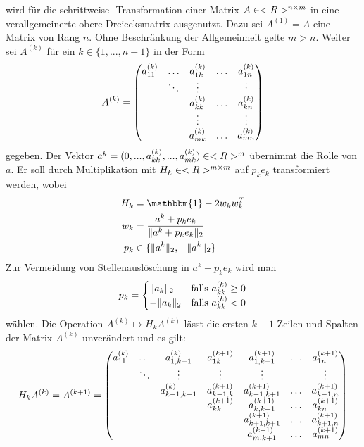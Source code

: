  wird für die schrittweise -Transformation einer Matrix $A\in<R>^{n\times m}$ in eine verallgemeinerte obere Dreiecksmatrix ausgenutzt. Dazu sei $A^{(1)}=A$ eine Matrix von Rang $n$. Ohne Beschränkung der Allgemeinheit gelte $m>n$. Weiter sei $A^{(k)}$ für ein $k\in\{1,...,n+1\}$ in der Form
\begin{align}
	A^{(k)} = \begin{pmatrix}
	a_{11}^{(k)} & \dots & a_{1k}^{(k)} & \dots & a_{1n}^{(k)} \\
	& \ddots & \vdots & & \vdots \\
	&& a_{kk}^{(k)} &  \dots & a_{kn}^{(k)} \\
	&& \vdots & & \vdots \\
	&& a_{mk}^{(k)} & \dots & a_{mn}^{(k)} 
	\end{pmatrix}\notag
\end{align}
gegeben. Der Vektor $a^k=(0,...,a_{kk}^{(k)},...,a_{mk}^{(k)})\in<R>^m$ übernimmt die Rolle von $a$. Er soll durch Multiplikation mit $H_k\in<R>^{m\times m}$ auf $p_ke_k$ transformiert werden, wobei
\begin{align}
	H_k &= \mathbbm{1} - 2w_kw_k^T \notag \\
	w_k &= \frac{a^k+p_ke_k}{\Vert a^k+p_ke_k\Vert_2} \notag \\
	p_k &\in \{\Vert a^k\Vert_2,-\Vert a^k\Vert_2\} \notag
\end{align}
Zur Vermeidung von Stellenauslöschung in $a^k+p_ke_k$ wird man
\begin{align}
	p_k = \begin{cases}
	\Vert a_k\Vert_2 & \text{falls } a_{kk}^{(k)}\ge 0 \\
	-\Vert a_k\Vert_2 & \text{falls } a_{kk}^{(k)}<0
	\end{cases}\notag
\end{align}
wählen. Die Operation $A^{(k)}\mapsto H_kA^{(k)}$ lässt die ersten $k-1$ Zeilen und Spalten der Matrix $A^{(k)}$ unverändert und es gilt:
\begin{align}
	H_kA^{(k)} = A^{(k+1)}  = \begin{pmatrix}
	a_{11}^{(k)} & \dots & a_{1,k-1}^{(k)} & a_{1k}^{(k+1)} & a_{1,k+1}^{(k+1)} & \dots & a_{1n}^{(k+1)} \\
	& \ddots & \vdots  & \vdots & \vdots & & \vdots \\
	&& a_{k-1,k-1}^{(k)} & a_{k-1,k}^{(k+1)} & a_{k-1,k+1}^{(k+1)} & \dots & a_{k-1,n}^{(k+1)} \\
	&&& a_{kk}^{(k+1)} & a_{k,k+1}^{(k+1)} & \dots & a_{kn}^{(k+1)} \\
	&&&& a_{k+1,k+1}^{(k+1)} & \dots & a_{k+1,n}^{(k+1)} \\
	&&&& a_{m,k+1}^{(k+1)} & \dots & a_{mn}^{(k+1)}
	\end{pmatrix} \notag
\end{align}
